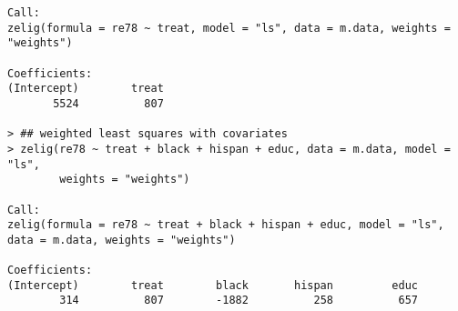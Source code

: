 \begin{description}
\begin{verbatim}
Call:
zelig(formula = re78 ~ treat, model = "ls", data = m.data, weights =
"weights")

Coefficients:
(Intercept)        treat  
       5524          807 

> ## weighted least squares with covariates
> zelig(re78 ~ treat + black + hispan + educ, data = m.data, model = "ls", 
        weights = "weights")

Call:
zelig(formula = re78 ~ treat + black + hispan + educ, model = "ls",
data = m.data, weights = "weights")

Coefficients:
(Intercept)        treat        black       hispan         educ  
        314          807        -1882          258          657  
\end{verbatim}


 \end{description}


